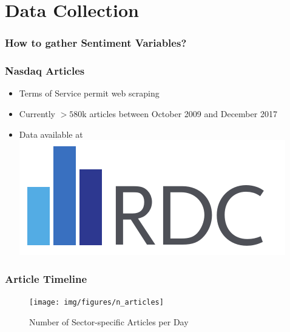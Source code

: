 \section{Data Collection}

\begin{frame}
    \frametitle{How to gather Sentiment Variables?}
    \scalebox{0.78}{
        
    }
\end{frame}


\begin{frame}
    \frametitle{Nasdaq Articles}
    \label{lab:articles}

    \begin{itemize}
        \item Terms of Service permit web scraping
        \item Currently $>580$k articles between October 2009 and December 2017
        \item Data available at \hspace{-0.1pt}
        \textcolor{iseblue}{\href{http://sfb649.wiwi.hu-berlin.de/fedc/index.php}{\includegraphics[scale=0.18]{img/logos/rdc}}}
    \end{itemize}
\end{frame}


\begin{frame}
    \frametitle{Article Timeline}
    \vspace{5pt}
    \begin{figure}[htb]
        \begin{center}
            \texttt{[image: img/figures/n\_articles]}
        \end{center}
        \vspace{-10pt}
        \caption{Number of Sector-specific Articles per Day}
    \end{figure}
\end{frame}



